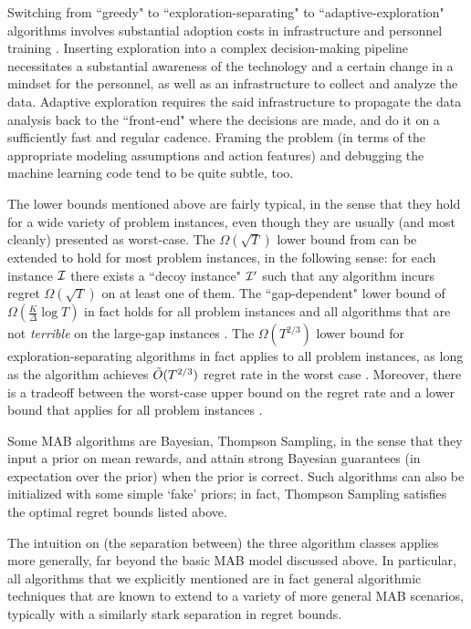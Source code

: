 
Switching from ``greedy" to ``exploration-separating" to ``adaptive-exploration" algorithms involves substantial adoption costs in infrastructure and personnel training \citep{DS-arxiv}. Inserting exploration into a complex decision-making pipeline necessitates a substantial awareness of the technology and a certain change in a mindset for the personnel, as well as an infrastructure to collect and analyze the data. Adaptive exploration requires the said infrastructure to propagate the data analysis back to the ``front-end" where the decisions are made, and do it on a sufficiently fast and regular cadence. Framing the problem (in terms of the appropriate modeling assumptions and action features) and debugging the machine learning code tend to be quite subtle, too.

The lower bounds mentioned above are fairly typical, in the sense that they hold for a wide variety of problem instances, even though they are usually (and most cleanly) presented as worst-case. The $\Omega(\sqrt{T})$ lower bound from \citet{bandits-exp3} can be extended to hold for most problem instances, in the following sense: for each instance $\mathcal{I}$ there exists a ``decoy instance" $\mathcal{I}'$ such that any algorithm incurs regret $\Omega(\sqrt{T})$ on at least one of them. The ``gap-dependent" lower bound of
 $\Omega(\tfrac{K}{\Delta}\log T)$
in fact holds for all problem instances and all algorithms that are not \emph{terrible} on the large-gap instances \citep{Lai-Robbins-85}. The $\Omega(T^{2/3})$ lower bound for exploration-separating algorithms in fact applies to all problem instances, as long as the algorithm achieves $\tilde{O}(T^{2/3})$ regret rate in the worst case \citep{MechMAB-ec09}.
Moreover, there is a tradeoff between the worst-case upper bound on the regret rate and a lower bound that applies for all problem instances \citep[Theorem 4.3 in][using the same proof technique]{MechMAB-ec09}.

Some MAB algorithms are Bayesian, \eg Thompson Sampling,  in the sense that they input a prior on mean rewards, and attain strong Bayesian guarantees (in expectation over the prior) when the prior is correct. Such algorithms can also be initialized with some simple `fake' priors; in fact, Thompson Sampling satisfies the optimal regret bounds listed above.

The intuition on (the separation between) the three algorithm classes applies more generally, far beyond the basic MAB model discussed above. In particular, all algorithms that we explicitly mentioned are in fact general algorithmic techniques that are known to extend to a variety of more general MAB scenarios, typically with a similarly stark separation in regret bounds.


